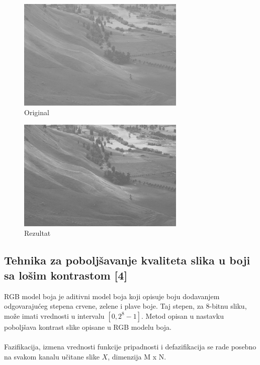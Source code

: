 \documentclass[12pt,a4paper]{article}
\theoremstyle{definition}
\theoremstyle{remark}
\theoremstyle{plain}
\begin{document}
\begin{multicols}{2}
\begin{figure}[H]
\centering
\includegraphics[width=8cm]{images/field.jpg}
  \caption{Original}\label{tree_fuzzy_grayscale_input}
\end{figure}
\columnbreak
\begin{figure}[H]
\centering
\includegraphics[width=8cm]{images/fuzzy_grayscale_2.jpg}
  \caption{Rezultat}\label{fuzzy_grayscale_output2}
\end{figure}
\end{multicols}

\subsection{Tehnika za pobolj\v savanje kvaliteta slika u boji sa lo\v sim kontrastom [4]}

RGB model boja je aditivni model boja koji opisuje boju dodavanjem odgovaraju\' ceg stepena crvene, zelene i plave boje. Taj stepen, za 8-bitnu sliku, mo\v ze imati vrednosti u intervalu $[0, 2^8 - 1]$. 
Metod opisan u nastavku pobolj\v sava kontrast slike opisane u RGB modelu boja. \\ \\
Fazifikacija, izmena vrednosti funkcije pripadnosti i defazifikacija se rade posebno na svakom kanalu u\v citane slike $X$, dimenzija M x N.\\
\end{document}
